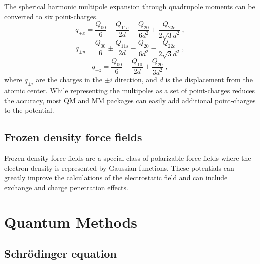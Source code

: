 \documentclass[12pt]{report}
\begin{document}
The spherical harmonic multipole expansion through quadrupole moments can be
converted to six point-charges. \cite{}
\begin{equation}
 q_{\pm x} = \frac{Q_{00}}{6} \pm \frac{Q_{11c}}{2d} -
          \frac{Q_{20}}{6d^2} + \frac{Q_{22c}}{2\sqrt{3}d^2} \; ,
\end{equation}
\begin{equation}
 q_{\pm y} = \frac{Q_{00}}{6} \pm \frac{Q_{11s}}{2d} -
          \frac{Q_{20}}{6d^2} - \frac{Q_{22c}}{2\sqrt{3}d^2} \; ,
\end{equation}
\begin{equation}
 q_{\pm z} = \frac{Q_{00}}{6} \pm \frac{Q_{10}}{2d} +
          \frac{Q_{20}}{3d^2} \; ,
\end{equation}
where $q_{\pm i}$ are the charges in the $\pm i$ direction, and $d$ is the
displacement from the atomic center. While representing the multipoles as a
set of point-charges reduces the accuracy, most QM and MM packages can easily
add additional point-charges to the potential.

\subsection{Frozen density force fields}

Frozen density force fields are a special class of polarizable force fields
where the electron density is represented by Gaussian functions. These
potentials can greatly improve the calculations of the electrostatic field and
can include exchange and charge penetration effects.

\FloatBarrier

\section{Quantum Methods}

\subsection{Schr\"{o}dinger equation}
\end{document}
